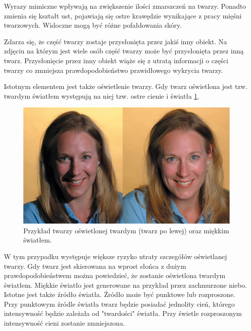 \documentclass[a4paper,twoside,12pt]{book}
\begin{document}
    Wyrazy mimiczne wpływają na zwiększenie ilości zmarszczeń na twarzy.
    Ponadto zmienia się kształt ust, pojawiają się ostre krawędzie wynikające z pracy mięśni twarzowych.
    Widoczne mogą być różne pofałdowania skóry.

    Zdarza się, że część twarzy zostaje przysłonięta przez jakiś inny obiekt.
    Na zdjęciu na którym jest wiele osób część twarzy może być przysłonięta przez inną twarz.
    Przysłonięcie przez inny obiekt wiąże się z utratą informacji o części twarzy co zmniejsza prawdopodobieństwo
    prawidłowego wykrycia twarzy.

    Istotnym elementem jest także oświetlenie twarzy.
    Gdy twarz oświetlona jest tzw. twardym światłem występują na
    niej tzw. ostre cienie i światła \ref{fig.oswietlenieTwarzy}.
    \begin{figure}
        \centering
        \includegraphics[width=12cm]{Obrazy/oswietlenieTwarzy.jpg}
        \caption{Przykład twarzy oświetlonej twardym (twarz po lewej) oraz miękkim światłem. \cite{oswietlenieTwarzy}}
        \label{fig.oswietlenieTwarzy}
    \end{figure}
    W tym przypadku występuje większe ryzyko utraty szczegółów oświetlanej twarzy.
    Gdy twarz jest skierowana na wprost słońca z dużym
    prawdopodobieństwem można powiedzieć, że zostanie oświetlona twardym światłem.
    Miękkie światło jest generowane na przykład przez zachmurzone niebo.
    Istotne jest także źródło światła.
    Źródło może być punktowe lub rozproszone.
    Przy punktowym źródle światła twarz będzie
    posiadać jednolity cień, którego intensywność będzie zależała od "twardości" światła.
    Przy świetle rozproszonym intensywność cieni zostanie zmniejszona.
\end{document}
